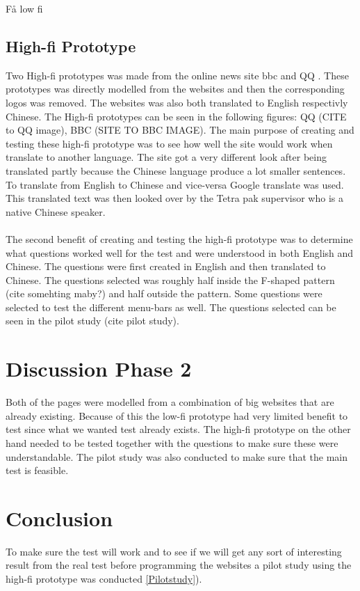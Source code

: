 Få low fi 

\subsection{High-fi Prototype}
Two High-fi prototypes was made from the online news site bbc \cite{bbc} and QQ \cite{qq_homepage}. These prototypes was directly modelled from the websites and then the corresponding logos was removed. The websites was also both translated to English respectivly Chinese. The High-fi prototypes can be seen in the following figures: QQ (CITE to QQ image), BBC (SITE TO BBC IMAGE). The main purpose of creating and testing these high-fi prototype was to see how well the site would work when translate to another language. The site got a very different look after being translated partly because the Chinese language produce a lot smaller sentences. To translate from English to Chinese and vice-versa Google translate was used. This translated text was then looked over by the Tetra pak supervisor who is a native Chinese speaker. 
\\\\
The second benefit of creating and testing the high-fi prototype was to determine what questions worked well for the test and were understood in both English and Chinese. The questions were first created in English and then translated to Chinese. The questions selected was roughly half inside the F-shaped pattern (cite somehting maby?) and half outside the pattern. Some questions were selected to test the different menu-bars as well. The questions selected can be seen in the pilot study (cite pilot study).


\section{Discussion Phase 2}
Both of the pages were modelled from a combination of big websites that are already existing. Because of this the low-fi prototype had very limited benefit to test since what we wanted test already exists. The high-fi prototype on the other hand needed to be tested together with the questions to make sure these were understandable. The pilot study was also conducted to make sure that the main test is feasible. 

\section{Conclusion}
To make sure the test will work and to see if we will get any sort of interesting result from the real test before programming the websites a pilot study using the high-fi prototype was conducted \ref{Pilotstudy}).



